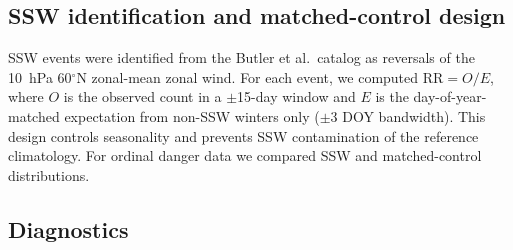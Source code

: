 \documentclass[11pt,letterpaper]{article}
\begin{document}
\subsection*{SSW identification and matched-control design}

SSW events were identified from the Butler et al.\ catalog\cite{Butler2015} as reversals of the 10~hPa 60$^\circ$N zonal-mean zonal wind. For each event, we computed $\mathrm{RR} = O / E$, where $O$ is the observed count in a $\pm$15-day window and $E$ is the day-of-year-matched expectation from non-SSW winters only ($\pm$3 DOY bandwidth). This design controls seasonality and prevents SSW contamination of the reference climatology. For ordinal danger data we compared SSW and matched-control distributions.

\subsection*{Diagnostics}
\end{document}
